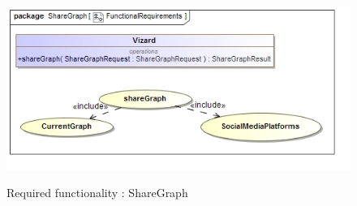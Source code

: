\documentclass[a4paper,12pt]{article}
\begin{document}
	\begin{figure}[H]
		\includegraphics[width=\textwidth]{Images/uc__ShareGraph}  \\
		\caption{Required functionality : ShareGraph}
	\end{figure}
\end{document}
